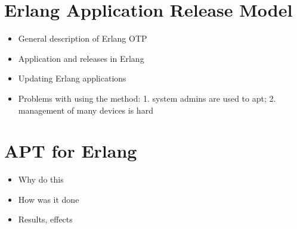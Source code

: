 \documentclass[10pt]{article}
\begin{document}
\section{Erlang Application Release Model}


\begin{itemize}
	\item General description of Erlang OTP
	\item Application and releases in Erlang
	\item Updating Erlang applications 
	\item Problems with using the method: 1. system admins are used to apt; 2. management of many devices is hard
\end{itemize}







\section{APT for Erlang}

\begin{itemize}
	\item Why do this
	\item How was it done 
	\item Results, effects 
\end{itemize}





\end{document}
